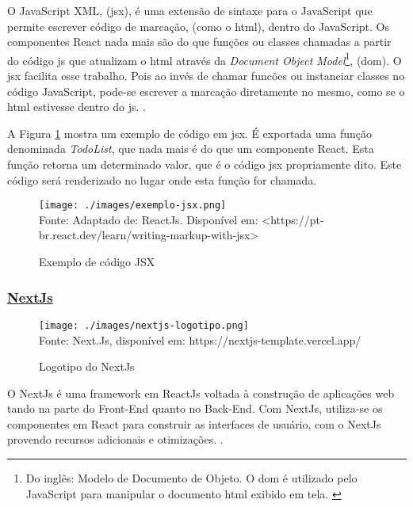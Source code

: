 
O JavaScript XML, (\acrshort{jsx}),
é uma extensão de sintaxe para o JavaScript que permite escrever
código de marcação, (como o \acrshort{html}),
dentro do JavaScript. Os componentes React nada mais são do que
funções ou classes chamadas a partir do código
\acrshort{js}
que atualizam o
\acrshort{html}
através da
\textit{Document Object Model}\footnote{Do inglês: Modelo de Documento de Objeto. O
    \acrshort{dom}
    é utilizado pelo JavaScript para manipular o documento
    \acrshort{html}
    exibido em tela.
    \cite{alura-dom}
 },
(\acrshort{dom}).
O
\acrshort{jsx}
facilita esse trabalho. Pois ao invés de chamar
funcões ou instanciar classes no código JavaScript,
pode-se escrever a marcação diretamente no mesmo,
como se o 
\acrshort{html}
estivesse dentro do
\acrshort{js}.
\cite{react-jsx}.

A
Figura \ref{fig:exemplo-jsx}
mostra um exemplo de código em
\acrshort{jsx}.
É exportada uma função denominada \textit{TodoList},
que nada mais é do que um componente React.
Esta função retorna um determinado valor, que é
o código
\acrshort{jsx}
propriamente dito. Este código será renderizado
no lugar onde esta função for chamada.

\begin{figure}[H]
    \centering
    \caption{Exemplo de código JSX}
    \texttt{[image: ./images/exemplo-jsx.png]}
    \label{fig:exemplo-jsx} \\
    \textnormal{\fontsize{10pt}{12pt}Fonte: Adaptado de: ReactJs. Disponível em: <https://pt-br.react.dev/learn/writing-markup-with-jsx>}
\end{figure}

\subsubsection{\underline{NextJs}}

\begin{figure}[H]
    \centering
    \caption{Logotipo do NextJs}
    \texttt{[image: ./images/nextjs-logotipo.png]}
    \label{fig:nextjs-logotipo} \\
    \textnormal{\fontsize{10pt}{12pt}Fonte: Next.Js, disponível em: https://nextjs-template.vercel.app/}
\end{figure}

O NextJs é uma framework em ReactJs voltada à construção de aplicações
\acrshort{web}
tando na parte do Front-End quanto no Back-End.
Com NextJs, utiliza-se os componentes em React para construir as interfaces
de usuário, com o NextJs provendo recursos adicionais e otimizações.
\cite{nexjs-docs}.

